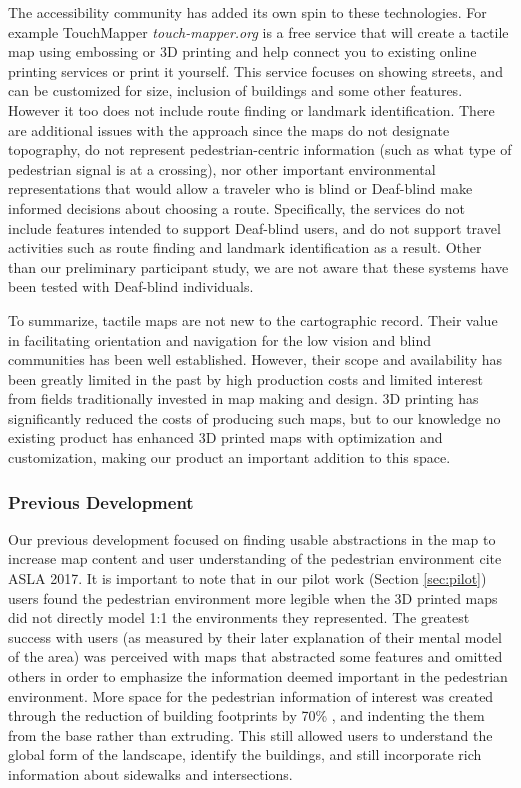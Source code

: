The accessibility community has added its own spin to these technologies. For example TouchMapper \textit{touch-mapper.org} is a free service that will create a tactile map using embossing or 3D printing and help connect you to existing online printing services or print it yourself.  This service focuses on showing streets, and can be customized for size, inclusion of buildings and some other features. However it too does not include route finding or landmark identification. There are additional issues with the approach since the maps do not designate topography, do not represent pedestrian-centric information (such as what type of pedestrian signal is at a crossing), nor other important environmental representations that would allow a traveler who is blind or Deaf-blind make informed decisions about choosing a route. 
Specifically, the services do not include features intended to support Deaf-blind users, and do not support travel activities such as route finding and landmark identification as a result. Other than our preliminary participant study, we are not aware that these systems have been tested with Deaf-blind individuals.


To summarize, tactile maps are not new to the cartographic record. Their value in facilitating orientation and navigation for the low vision and blind communities has been well established. However, their scope and availability has been greatly limited in the past by high production costs and limited interest from fields traditionally invested in map making and design.  3D printing has significantly reduced the costs of producing such maps, but to our knowledge no existing product has enhanced 3D printed maps with optimization and customization, making our product an important addition to this space. 


\subsubsection{Previous Development}

Our previous development focused on finding usable abstractions in the map to increase map content and user understanding of the pedestrian environment \ac{cite ASLA 2017}.
It is important to note that in our pilot work (Section \ref{sec:pilot}) users found the pedestrian environment more legible when the 3D printed maps did not directly model 1:1 the environments they represented. The greatest success with users (as measured by their later explanation of their mental model of the area) was perceived with maps that abstracted some features and omitted others in order to emphasize the information deemed important in the pedestrian environment. More space for the pedestrian information of interest was created through the reduction of building footprints by 70\% , and indenting the  them from the base rather than extruding. This still allowed users to understand the global form of the landscape, identify the buildings, and still incorporate rich information about sidewalks and intersections.


